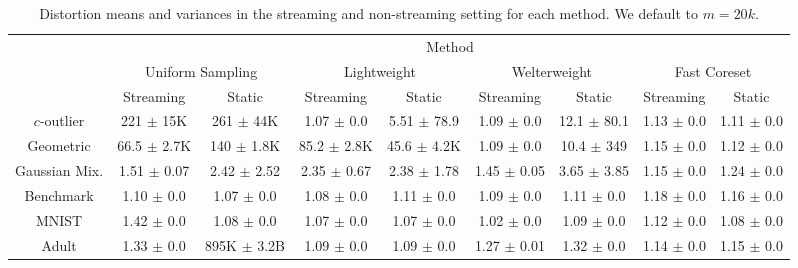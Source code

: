 \begin{table*}
    \centering
    \tiny
    \begin{tabular}{|c|cc|cc|cc|cc|}
        \hline
        & \multicolumn{8}{c|}{Method} \\
        \cline{2-9} & \multicolumn{2}{c|}{Uniform Sampling} & \multicolumn{2}{c|}{Lightweight} & \multicolumn{2}{c|}{Welterweight} & \multicolumn{2}{c|}{Fast Coreset} \\
        & Streaming & Static & Streaming & Static & Streaming & Static & Streaming & Static \\
        \cline{2-9}
        $c$-outlier & 221 $\pm$ 15K & 261 $\pm$ 44K & 1.07 $\pm$ 0.0 & 5.51 $\pm$ 78.9 & 1.09 $\pm$ 0.0 & 12.1 $\pm$ 80.1 & 1.13 $\pm$ 0.0 & 1.11 $\pm$
        0.0 \\
        Geometric & 66.5 $\pm$ 2.7K & 140 $\pm$ 1.8K & 85.2 $\pm$ 2.8K & 45.6 $\pm$ 4.2K & 1.09 $\pm$ 0.0 & 10.4 $\pm$ 349 & 1.15 $\pm$ 0.0 & 1.12 $\pm$ 0.0 \\
        Gaussian Mix. & 1.51 $\pm$ 0.07 & 2.42 $\pm$ 2.52 & 2.35 $\pm$ 0.67 & 2.38 $\pm$ 1.78 & 1.45 $\pm$ 0.05 & 3.65 $\pm$ 3.85 & 1.15 $\pm$ 0.0 & 1.24 $\pm$
        0.0 \\
        Benchmark & 1.10 $\pm$ 0.0 & 1.07 $\pm$ 0.0 & 1.08 $\pm$ 0.0 & 1.11 $\pm$ 0.0 & 1.09 $\pm$ 0.0 & 1.11 $\pm$ 0.0 & 1.18 $\pm$ 0.0 & 1.16 $\pm$ 0.0 \\
        MNIST & 1.42 $\pm$ 0.0 & 1.08 $\pm$ 0.0 & 1.07 $\pm$ 0.0 & 1.07 $\pm$ 0.0 & 1.02 $\pm$ 0.0 & 1.09 $\pm$ 0.0 & 1.12 $\pm$ 0.0 & 1.08 $\pm$ 0.0 \\
        Adult & 1.33 $\pm$ 0.0 & 895K $\pm$ 3.2B & 1.09 $\pm$ 0.0 & 1.09 $\pm$ 0.0 & 1.27 $\pm$ 0.01 & 1.32 $\pm$ 0.0 & 1.14 $\pm$ 0.0 & 1.15 $\pm$ 0.0 \\
        \hline
    \end{tabular}
    \caption{Distortion means and variances in the streaming and non-streaming setting for each method. We default to $m=20k$.}
    \label{tbl:composition}
\end{table*}


